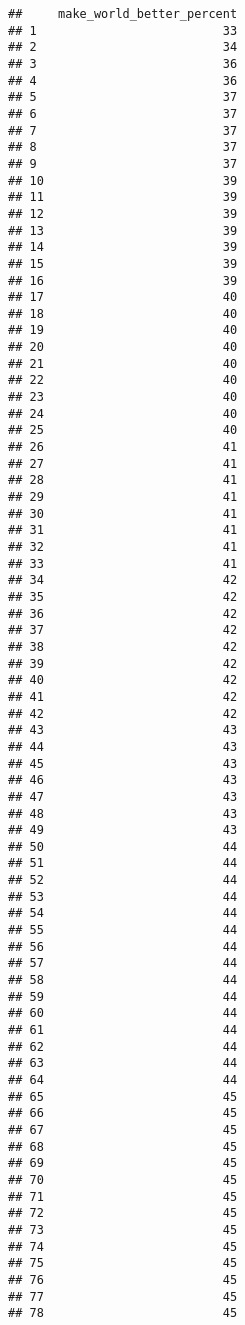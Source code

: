 \documentclass[
]{article}
\begin{document}
\begin{verbatim}
##     make_world_better_percent
## 1                          33
## 2                          34
## 3                          36
## 4                          36
## 5                          37
## 6                          37
## 7                          37
## 8                          37
## 9                          37
## 10                         39
## 11                         39
## 12                         39
## 13                         39
## 14                         39
## 15                         39
## 16                         39
## 17                         40
## 18                         40
## 19                         40
## 20                         40
## 21                         40
## 22                         40
## 23                         40
## 24                         40
## 25                         40
## 26                         41
## 27                         41
## 28                         41
## 29                         41
## 30                         41
## 31                         41
## 32                         41
## 33                         41
## 34                         42
## 35                         42
## 36                         42
## 37                         42
## 38                         42
## 39                         42
## 40                         42
## 41                         42
## 42                         42
## 43                         43
## 44                         43
## 45                         43
## 46                         43
## 47                         43
## 48                         43
## 49                         43
## 50                         44
## 51                         44
## 52                         44
## 53                         44
## 54                         44
## 55                         44
## 56                         44
## 57                         44
## 58                         44
## 59                         44
## 60                         44
## 61                         44
## 62                         44
## 63                         44
## 64                         44
## 65                         45
## 66                         45
## 67                         45
## 68                         45
## 69                         45
## 70                         45
## 71                         45
## 72                         45
## 73                         45
## 74                         45
## 75                         45
## 76                         45
## 77                         45
## 78                         45

\end{verbatim}
\end{document}
